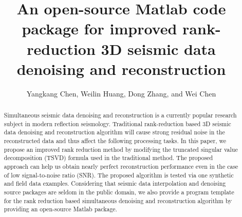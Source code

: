 
\title{An open-source Matlab code package for improved  rank-reduction 3D  seismic data denoising and reconstruction}

\renewcommand{\thefootnote}{\fnsymbol{footnote}}
\author{Yangkang Chen\footnotemark[1], Weilin Huang\footnotemark[2], Dong Zhang\footnotemark[2], and Wei Chen\footnotemark[3]}
\address{
\footnotemark[1]Bureau of Economic Geology \\
John A. and Katherine G. Jackson School of Geosciences \\
The University of Texas at Austin \\
University Station, Box X \\
Austin, TX 78713-8924 \\
Email: ykchen@utexas.edu \\
\footnotemark[2] State Key Laboratory of Petroleum Resources and Prospecting \\
China University of Petroleum \\
Fuxue Road 18th\\
Beijing, China, 102200 \\
cup\_hwl@126.com  \&  zhangdongconan@163.com \\
\footnotemark[3]
School of Geophysics and Oil Resource \\
Yangtze University\\
Jingzhou, Hubei Province, China, 434023\\
chenwei2014@yangtzeu.edu.cn 
}

\maketitle
{}

\begin{abstract}
Simultaneous seismic data denoising and reconstruction is a currently popular research subject in modern reflection seismology. Traditional rank-reduction based 3D seismic data denoising and reconstruction algorithm will cause strong residual noise in the reconstructed data and thus affect the following processing tasks. In this paper, we propose an improved rank reduction method by  modifying the truncated singular value decomposition (TSVD) formula used in the traditional method. The proposed approach can help us obtain nearly perfect reconstruction performance even in the case of low signal-to-noise ratio (SNR). The proposed algorithm is tested via one synthetic and field data examples. Considering that seismic data interpolation and denoising source packages are seldom in the public domain, we also provide a program template for the rank reduction based simultaneous denoising and reconstruction algorithm by providing an open-source Matlab package. 
\end{abstract}


